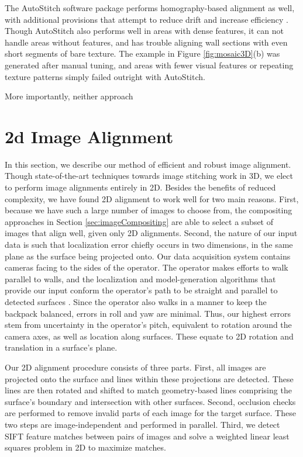 \documentclass[]{spie}  %
\begin{document}
The AutoStitch software package performs homography-based alignment as
well, with additional provisions that attempt to reduce drift and
increase efficiency \cite{panorama2d, autostitch}. Though AutoStitch
also performs well in areas with dense features, it can not handle
areas without features, and has trouble aligning wall sections with
even short segments of bare texture. The example in Figure
\ref{fig:mosaic3D}(b) was generated after manual tuning, and areas
with fewer visual features or repeating texture patterns simply failed
outright with AutoStitch.

More importantly, neither approach 



\section{2d Image Alignment}
\label{sec:2dAlignment}

In this section, we describe our method of efficient and robust image
alignment. Though state-of-the-art techniques towards image stitching
work in 3D, we elect to perform image alignments entirely in
2D. Besides the benefits of reduced complexity, we have found 2D
alignment to work well for two main reasons. First, because we have
such a large number of images to choose from, the compositing
approaches in Section \ref{sec:imageCompositing} are able to select a
subset of images that align well, given only 2D alignments. Second,
the nature of our input data is such that localization error chiefly
occurs in two dimensions, in the same plane as the surface being
projected onto. Our data acquisition system contains cameras facing to
the sides of the operator. The operator makes efforts to walk parallel
to walls, and the localization and model-generation algorithms that
provide our input conform the operator's path to be straight and
parallel to detected surfaces \cite{kua2012loopclosure,
  sanchez2012point}. Since the operator also walks in a manner to keep
the backpack balanced, errors in roll and yaw are minimal. Thus, our
highest errors stem from uncertainty in the operator's pitch,
equivalent to rotation around the camera axes, as well as location
along surfaces. These equate to 2D rotation and translation in a
surface's plane.

Our 2D alignment procedure consists of three parts. First, all images
are projected onto the surface and lines within these projections are
detected. These lines are then rotated and shifted to match
geometry-based lines comprising the surface's boundary and
intersection with other surfaces. Second, occlusion checks are
performed to remove invalid parts of each image for the target
surface. These two steps are image-independent and performed in
parallel. Third, we detect SIFT feature matches between pairs of
images and solve a weighted linear least squares problem in 2D to
maximize matches.
\end{document}

